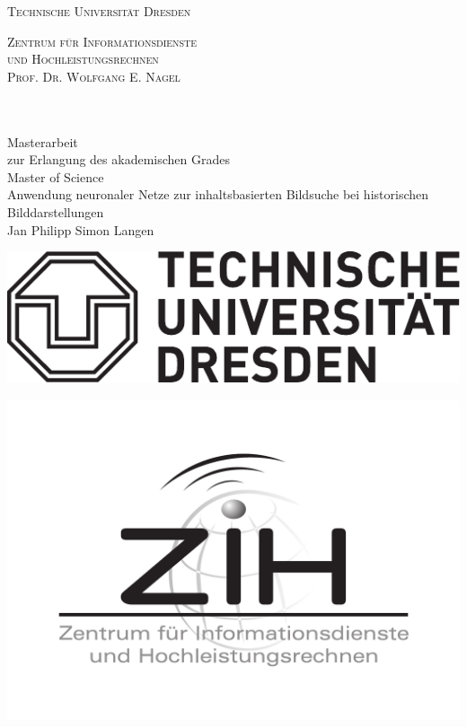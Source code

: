 \begin{titlepage}
\begin{center}
    \huge
    \textsc{Technische Universit\"{a}t Dresden}

    \bigskip
    \Large
    \textsc{Zentrum f\"{u}r Informationsdienste\\ und Hochleistungsrechnen\\
    Prof. Dr. Wolfgang E. Nagel\\
    $\quad$\\
    $\quad$}
    
    \Huge Masterarbeit \\[1cm]\large zur Erlangung des akademischen Grades\\ Master of Science
    \\[2cm]
    \huge Anwendung neuronaler Netze zur inhaltsbasierten Bildsuche bei historischen Bilddarstellungen
    \\[1cm]
    \Large Jan Philipp Simon Langen
    \\[6.2cm]
\end{center}
\hspace{0.03\textwidth}
\begin{minipage}[c]{0.25\textwidth}
\includegraphics[scale=0.5]{TUD_Logo_schwarz}
\end{minipage}
\hspace{0.44 \textwidth}
\begin{minipage}[c]{0.25\textwidth}
\includegraphics[scale=0.14]{zih_logo_de_sw}
\end{minipage}
\end{titlepage}